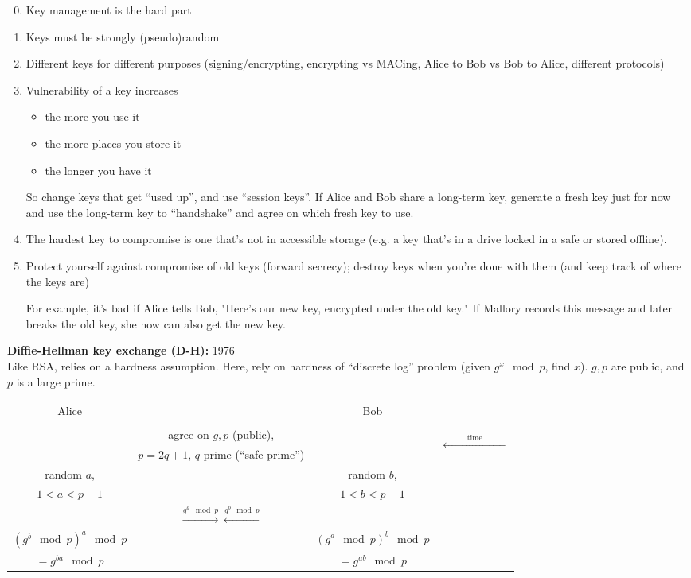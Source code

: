 \begin{enumerate}
\setcounter{enumi}{-1}
    \item Key management is the hard part
    \item Keys must be strongly (pseudo)random
    \item Different keys for different purposes (signing/encrypting, encrypting
        vs MACing, Alice to Bob vs Bob to Alice, different protocols)
    \item Vulnerability of a key increases
    \begin{itemize}
        \item the more you use it
        \item the more places you store it
        \item the longer you have it
    \end{itemize}
    So change keys that get ``used up'', and use ``session keys''. If Alice and
    Bob share a long-term key, generate a fresh key just for now and use the
    long-term key to ``handshake'' and agree on which fresh key to use.
    \item The hardest key to compromise is one that's not in accessible storage
        (e.g. a key that's in a drive locked in a safe or stored offline).
    \item Protect yourself against compromise of old keys (forward secrecy);
        destroy keys when you're done with them (and keep track of where the
        keys are)

        For example, it's bad if Alice tells Bob, "Here's our new key, encrypted under the old key." If Mallory records this message and later breaks the old key, she now can also get the new key.
\end{enumerate}

{\bf Diffie-Hellman key exchange (D-H):} 1976\\
Like RSA, relies on a hardness assumption. Here, rely on hardness of ``discrete
log'' problem (given $g^x \mod p$, find $x$). $g,p$ are public, and $p$ is a
large prime.

\begin{table}[h!]
\centering
\begin{tabular}{cccc}
Alice & & Bob & \\
\cline{1-3} & & & \multirow{8}{*}{\begin{sideways}$\xleftarrow{\quad\qquad\text{time}\qquad\quad}$\end{sideways}}\\
& agree on $g,p$ (public), & & \\
& $p = 2q+1$, $q$ prime (``safe prime'') & & \\
random $a$, & & random $b$, & \\
$1 < a < p-1$ & & $1 < b < p-1$ & \\
& $\xrightarrow{g^a \mod p} \xleftarrow{g^b \mod p}$ & & \\
$\left(g^b \mod p\right)^a \mod p$ & & $\left(g^a \mod p\right)^b \mod p$ & \\
$= g^{ba} \mod p$ & & $= g^{ab} \mod p$ &
\end{tabular}
\end{table}

